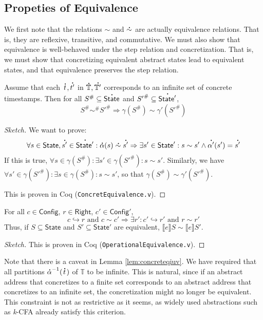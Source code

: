 \documentclass[acmsmall,screen,review]{acmart}\settopmatter{printfolios=true,printccs=false,printacmref=false}
\theoremstyle{acmdefinition}
\newcommand*{\A}[1]{\overset{\,_{\mbox{\Large .}}}{#1}}
\newcommand*{\Abs}[1]{{#1}^{\#}}
\newcommand*{\Time}{\mathbb{T}}
\newcommand*{\ATime}{\A{\Time}}
\newcommand*{\Config}{\mathsf{Config}}
\newcommand*{\config}{c}
\newcommand*{\Right}{\mathsf{Right}}
\newcommand*{\rightst}{r}
\newcommand*{\State}{\mathsf{State}}
\newcommand*{\AState}{\A{\mathsf{State}}}
\newcommand*{\semarrow}{\hookrightarrow}
\newcommand*{\equivalent}{\sim}
\newcommand*{\sembracket}[1]{\lBrack{#1}\rBrack}
\begin{document}
\subsection{Propeties of Equivalence}
We first note that the relations $\equivalent$ and $\A\equivalent$ are actually equivalence relations.
That is, they are reflexive, transitive, and commutative.
We must also show that equivalence is well-behaved under the step relation and concretization.
That is, we must show that concretizing equivalent abstract states lead to equivalent states, and that equivalence preserves the step relation.
\begin{lemma}\label{lem:concreteqiuv}
  Assume that each $\A{t},\A{t'}$ in $\ATime,\A{\Time'}$ corresponds to an infinite set of concrete timestamps.
  Then for all $\Abs{S}\subseteq\AState$ and $\Abs{S'}\subseteq\A{\State'}$,
  \[\Abs{S}\Abs\equivalent\Abs{S'}\Rightarrow\gamma(\Abs{S})\equivalent\gamma'(\Abs{S'})\]
\end{lemma}
\begin{proof}[Sketch]
  We want to prove:
  \[\forall s\in\State,\A{s'}\in\A{\State'}:\A\alpha(s)\A\equivalent\A{s'}\Rightarrow\exists s'\in\State':s\equivalent s'\land\A{\alpha'}(s')=\A{s'}\]
  If this is true, $\forall s\in\gamma(\Abs{S}):\exists s'\in\gamma(\Abs{S'}):s\equivalent s'$.
  Similarly, we have $\forall s'\in\gamma(\Abs{S'}):\exists s\in\gamma(\Abs{S}):s\equivalent s'$, so that $\gamma(\Abs{S})\equivalent\gamma'(\Abs{S'})$.

  This is proven in Coq (\texttt{ConcretEquivalence.v}).
\end{proof}
\begin{lemma}
  For all $\config\in\Config$, $\rightst\in\Right$, $\config'\in\Config'$,
  \[\config\semarrow\rightst\text{ and }\config\equivalent\config'\Rightarrow\exists\rightst':\config'\semarrow\rightst'\text{ and }\rightst\equivalent\rightst'\]
  Thus, if $S\subseteq\State$ and $S'\subseteq\State'$ are equivalent, $\sembracket{e}S\equivalent\sembracket{e}S'$.
\end{lemma}
\begin{proof}[Sketch]
  This is proven in Coq (\texttt{OperationalEquivalence.v}).
\end{proof}
Note that there is a caveat in Lemma \ref{lem:concreteqiuv}.
We have required that all partitions ${\A\alpha}^{-1}(\A{t})$ of $\Time$ to be infinite.
This is natural, since if an abstract address that concretizes to a finite set corresponds to an abstract address that concretizes to an infinite set, the concretization might no longer be equivalent.
This constraint is not as restrictive as it seems, as widely used abstractions such as \emph{k}-CFA already satisfy this criterion.
\end{document}
